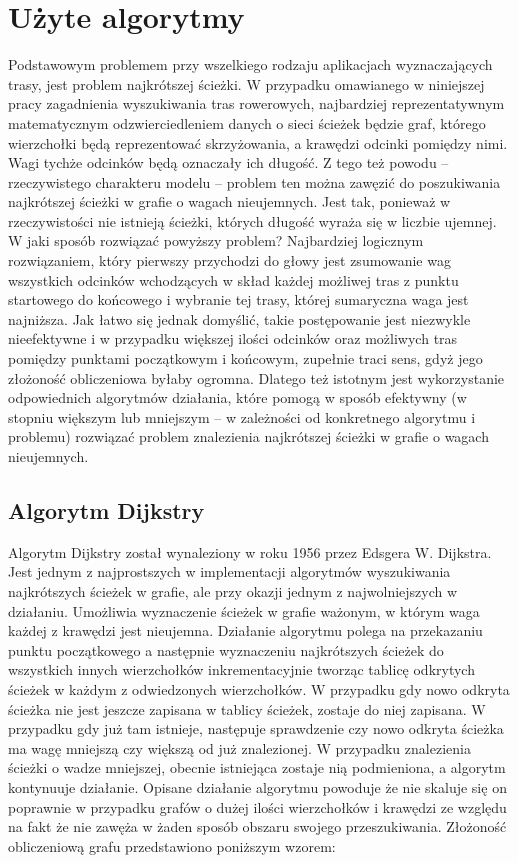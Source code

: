 \section{Użyte algorytmy}

Podstawowym problemem przy wszelkiego rodzaju aplikacjach wyznaczających trasy, jest problem najkrótszej ścieżki. W przypadku omawianego w niniejszej pracy zagadnienia wyszukiwania tras rowerowych, najbardziej reprezentatywnym matematycznym odzwierciedleniem danych o sieci ścieżek będzie graf, którego wierzchołki będą reprezentować skrzyżowania, a krawędzi odcinki pomiędzy nimi. Wagi tychże odcinków będą oznaczały ich długość. Z tego też powodu – rzeczywistego charakteru modelu – problem ten można zawęzić do poszukiwania najkrótszej ścieżki w grafie o wagach nieujemnych. Jest tak, ponieważ w rzeczywistości nie istnieją ścieżki, których długość wyraża się w liczbie ujemnej. W jaki sposób rozwiązać powyższy problem? Najbardziej logicznym rozwiązaniem, który pierwszy przychodzi do głowy jest zsumowanie wag wszystkich odcinków wchodzących w skład każdej możliwej tras z punktu startowego do końcowego i wybranie tej trasy, której sumaryczna waga jest najniższa. Jak łatwo się jednak domyślić, takie postępowanie jest niezwykle nieefektywne i w przypadku większej ilości odcinków oraz możliwych tras pomiędzy punktami początkowym i końcowym, zupełnie traci sens, gdyż jego złożoność obliczeniowa byłaby ogromna. Dlatego też istotnym jest wykorzystanie odpowiednich algorytmów działania, które pomogą w sposób efektywny (w stopniu większym lub mniejszym – w zależności od konkretnego algorytmu i problemu) rozwiązać problem znalezienia najkrótszej ścieżki w grafie o wagach nieujemnych.

\subsection{Algorytm Dijkstry}

Algorytm Dijkstry został wynaleziony w roku 1956 przez Edsgera W. Dijkstra. Jest jednym z najprostszych w implementacji algorytmów wyszukiwania najkrótszych ścieżek w grafie, ale przy okazji jednym z najwolniejszych w działaniu. Umożliwia wyznaczenie ścieżek w grafie ważonym, w którym waga każdej z krawędzi jest nieujemna. Działanie algorytmu polega na przekazaniu punktu początkowego a następnie wyznaczeniu najkrótszych ścieżek do wszystkich innych wierzchołków inkrementacyjnie tworząc tablicę odkrytych ścieżek w każdym z odwiedzonych wierzchołków. W przypadku gdy nowo odkryta ścieżka nie jest jeszcze zapisana w tablicy ścieżek, zostaje do niej zapisana. W przypadku gdy już tam istnieje, następuje sprawdzenie czy nowo odkryta ścieżka ma wagę mniejszą czy większą od już znalezionej. W przypadku znalezienia ścieżki o wadze mniejszej, obecnie istniejąca zostaje nią podmieniona, a algorytm kontynuuje działanie.\newline
Opisane działanie algorytmu powoduje że nie skaluje się on poprawnie w przypadku grafów o dużej ilości wierzchołków i krawędzi ze względu na fakt że nie zawęża w żaden sposób obszaru swojego przeszukiwania. Złożoność obliczeniową grafu przedstawiono poniższym wzorem:\newline

